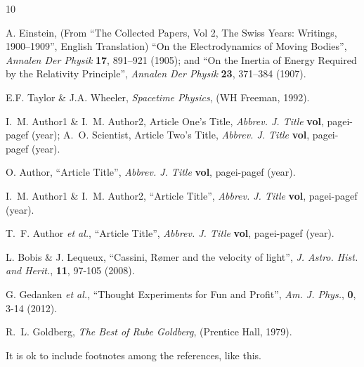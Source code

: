 \documentclass[aps,twocolumn,showpacs,preprintnumbers]{revtex4}
\begin{document}
\begin{thebibliography}{10}

 A. Einstein, (From ``The Collected Papers, Vol 2, The Swiss Years: Writings, 1900–1909'', English Translation) ``On the Electrodynamics of Moving Bodies'', {\it Annalen Der Physik} {\bf 17}, 891–921 (1905); and ``On the Inertia of Energy Required by the Relativity Principle'', {\it Annalen Der Physik} {\bf 23}, 371–384 (1907).

 E.F. Taylor \& J.A. Wheeler, {\it Spacetime Physics}, (WH Freeman, 1992).

 I.~M. Author1 \&  I.~M. Author2, Article One's Title, {\it Abbrev. J. Title} {\bf vol}, pagei-pagef (year); A.~O. Scientist, Article Two's Title, {\it Abbrev. J. Title} {\bf vol}, pagei-pagef (year).

 O. Author, ``Article Title'', {\it Abbrev. J. Title} {\bf vol}, pagei-pagef (year).

 I.~M. Author1 \&  I.~M. Author2,  ``Article Title'', {\it Abbrev. J. Title} {\bf vol}, pagei-pagef (year).

 T.~F. Author {\it et al.},  ``Article Title'', {\it Abbrev. J. Title} {\bf vol}, pagei-pagef (year).

 L. Bobis \& J. Lequeux,  ``Cassini, R\o mer and the velocity of light'', {\it J. Astro. Hist. and Herit.}, {\bf 11}, 97-105 (2008).

 G. Gedanken {\it et al.}, ``Thought Experiments for Fun and Profit'', {\it Am. J. Phys.}, {\bf 0}, 3-14 (2012).

 R.~L. Goldberg, {\it The Best of Rube Goldberg}, (Prentice Hall, 1979). 

 It is ok to include footnotes among the references, like this.

\end{thebibliography}
\end{document}
